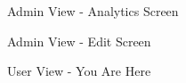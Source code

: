 \documentclass[12pt, titlepage]{article}
\begin{document}
\begin{figure}[hp!]
\begin{center}
    \caption{Admin View - Analytics Screen}
    \label{fig:analytics}
    \end{center}
\end{figure}

\begin{figure}[hp!]
\begin{center}
    \caption{Admin View - Edit Screen}
    \label{fig:edit}
    \end{center}
\end{figure}

\begin{figure}[hp!]
\begin{center}
    \caption{User View - You Are Here}
    \label{fig:youarehere}
    \end{center}
\end{figure}
\end{document}
